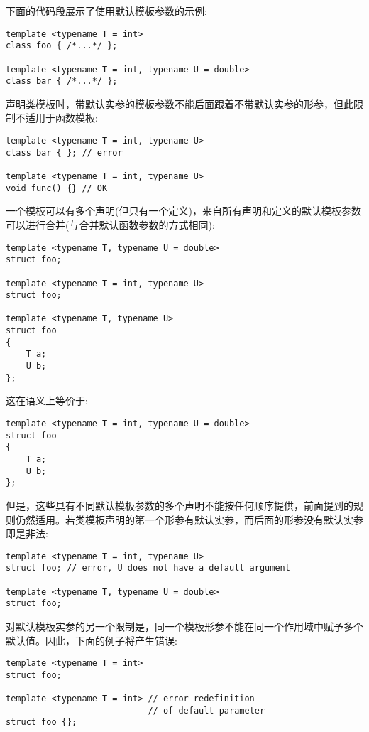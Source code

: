下面的代码段展示了使用默认模板参数的示例:

\begin{lstlisting}[style=styleCXX]
template <typename T = int>
class foo { /*...*/ };

template <typename T = int, typename U = double>
class bar { /*...*/ };
\end{lstlisting}

声明类模板时，带默认实参的模板参数不能后面跟着不带默认实参的形参，但此限制不适用于函数模板:

\begin{lstlisting}[style=styleCXX]
template <typename T = int, typename U>
class bar { }; // error

template <typename T = int, typename U>
void func() {} // OK
\end{lstlisting}

一个模板可以有多个声明(但只有一个定义)，来自所有声明和定义的默认模板参数可以进行合并(与合并默认函数参数的方式相同):

\begin{lstlisting}[style=styleCXX]
template <typename T, typename U = double>
struct foo;

template <typename T = int, typename U>
struct foo;

template <typename T, typename U>
struct foo
{
	T a;
	U b;
};
\end{lstlisting}

这在语义上等价于:

\begin{lstlisting}[style=styleCXX]
template <typename T = int, typename U = double>
struct foo
{
	T a;
	U b;
};
\end{lstlisting}

但是，这些具有不同默认模板参数的多个声明不能按任何顺序提供，前面提到的规则仍然适用。若类模板声明的第一个形参有默认实参，而后面的形参没有默认实参即是非法:

\begin{lstlisting}[style=styleCXX]
template <typename T = int, typename U>
struct foo; // error, U does not have a default argument

template <typename T, typename U = double>
struct foo;
\end{lstlisting}

对默认模板实参的另一个限制是，同一个模板形参不能在同一个作用域中赋予多个默认值。因此，下面的例子将产生错误:

\begin{lstlisting}[style=styleCXX]
template <typename T = int>
struct foo;

template <typename T = int> // error redefinition
                            // of default parameter
struct foo {};
\end{lstlisting}

